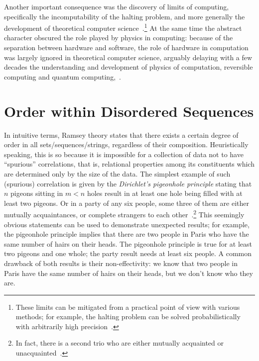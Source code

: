 \documentclass[12pt]{article}
\begin{document}
Another important consequence was the discovery of limits of computing,
specifically the incomputability of the halting problem,
and more generally the development of theoretical computer science~\cite{Gruska-foc}.\footnote{These limits can be mitigated from a practical point of view with various methods; for example, the halting problem can be solved probabilistically with arbitrarily high precision~\cite{DBLP:journals/computability/CaludeD18}.}
At the same time the abstract character  obscured the role played by physics in computing:
because of the separation between hardware and software, the role of hardware in computation was largely ignored in theoretical computer science,
arguably delaying with a few decades the understanding and development of physics of computation,
reversible computing and quantum computing,~\cite{1402-4896-35-1-021, fr-kn-mar2,mermin-07}.


\section{Order within Disordered Sequences}

\label{2018-wos-sec2}
In intuitive terms, Ramsey theory states that there exists a certain degree of order in all sets/sequences/strings,
regardless of their composition.
Heuristically speaking, this is so because it is impossible for a collection of data
not to have  ``spurious'' correlations, that is,
relational properties among its constituents which are determined only by the size of the data.
The simplest example of such (spurious) correlation is given by the {\em Dirichlet's pigeonhole principle}
stating that $n$ pigeons sitting in $m<n$ holes result in at least one hole being filled with at least two pigeons.
Or in a party of any six people, some three of them are either mutually acquaintances,
or complete strangers to each other~\cite{Greenwood-Gleason-55,Bostwick-1959}.\footnote{In fact,
there is a second trio who are either mutually acquainted or unacquainted~\cite{Bostwick-1959}.}
This seemingly obvious statements can be used to demonstrate unexpected results; for example, the
pigeonhole principle implies that there are two people in Paris who have the same number of hairs on their heads.
The pigeonhole principle is true for at least two pigeons and one whole; the party result needs at least six people.
A common drawback of both results is their non-effectivity: we know that two people in Paris have the same number
of hairs on their heads, but we don't know who they are.
\end{document}
